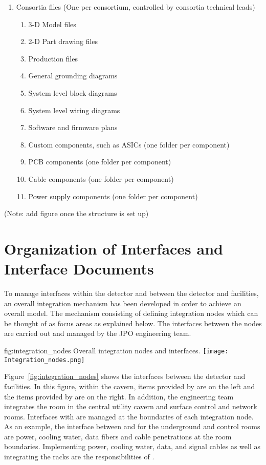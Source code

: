 \begin{enumerate}
\begin{enumerate}
\begin{enumerate}
  \end{enumerate}
 \end{enumerate}
 \item Consortia files (One per consortium, controlled by consortia technical leads)
 \begin{enumerate}
   \item 3-D Model files
   \item 2-D Part drawing files
   \item Production files
   \item General grounding diagrams
   \item System level block diagrams
   \item System level wiring diagrams
   \item Software and firmware plans
   \item Custom components, such as ASICs (one folder per component)
   \item PCB components (one folder per component)
   \item Cable components (one folder per component)
   \item Power supply components (one folder per component)
 \end{enumerate}
\end{enumerate}
(Note: add figure once the  structure is set up)


\section{ Organization of Interfaces and Interface Documents}
\label{sec:fdsp-coord-integ-interface}

To manage interfaces within the detector and between the detector and
facilities, an overall integration mechanism has been developed in
order to achieve an overall model.  The mechanism consisting of
defining integration nodes which can be thought of as focus areas as
explained below.  The interfaces between the nodes are carried out and
managed by the JPO engineering team.


\begin{dunefigure}{fig:integration_nodes}
  {Overall integration nodes and interfaces.}
  \texttt{[image: Integration\_nodes.png]}
\end{dunefigure}

Figure~\ref{fig:integration_nodes} shows the interfaces between the
detector and facilities. In this figure, within the cavern, items
provided by  are on the left and the items provided by
 are on the right. In addition, the  engineering
team integrates the  room in the central utility cavern and
surface control and network rooms. Interfaces with  are
managed at the boundaries of each integration node. As an example, the
interface between  and  for the underground
 and control rooms are power, cooling water, data fibers
and cable penetrations at the room boundaries. Implementing power,
cooling water, data, and signal cables as well as integrating the
racks are the responsibilities of .


